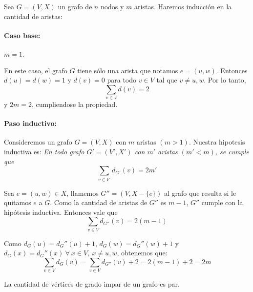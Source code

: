 \begin{demo}
	Sea \(G = (V, X)\) un grafo de \(n\) nodos y \(m\) aristas. Haremos inducción en la cantidad de aristas:

	\paragraph{Caso base:} \(m = 1\).

	En este caso, el grafo \(G\) tiene sólo una arista que notamos \(e = (u,w)\). Entonces \(d(u) = d(w) = 1\) y \(d(v) = 0\) para todo \(v\in V\) tal que \(v\neq u,w\). Por lo tanto, \[\sum_{v\in V}d(v) = 2\] y \(2m = 2\), cumpliendose la propiedad.
	\paragraph{Paso inductivo:} Consideremos un grafo \(G=(V,X)\) con \(m\) aristas \((m > 1)\). Nuestra hipotesis inductiva es: \textit{En todo grafo \(G' = (V', X')\) con \(m'\) aristas \((m' < m)\), se cumple que } \[\sum_{v\in V'}{d_{G'}}(v) = 2m'\]

	Sea \(e = (u,w) \in X\), llamemos \(G'' = (V, X-\{e\})\) al grafo que resulta si le quitamos \(e\) a \(G\). Como la cantidad de aristas de \(G''\) es \(m-1\), \(G''\) cumple con la hipótesis inductiva. Entonces vale que
	\[\sum_{v\in V}{d_{G''}}(v) = 2(m-1)\]

	Como \(d_G(u) = d_G''(u) + 1\), \(d_G(w) = d_G''(w) + 1\) y \(d_G(x) = d_G''(x)~\forall~x\in V,~x\neq u,w\), obtenemos que: \[\sum_{v\in V}{d_{G}}(v) = \sum_{v\in V}{d_{G''}}(v) + 2 = 2(m-1) + 2 = 2m\]
\end{demo}

\begin{coro}
	La cantidad de vértices de grado impar de un grafo es par.
\end{coro}

